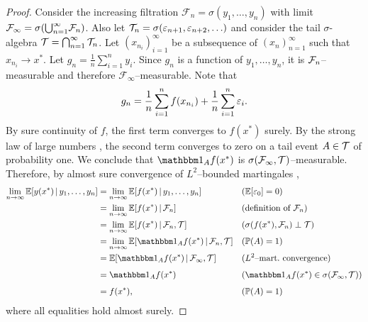 \documentclass[12pt, twoside]{report}
\begin{document}
\begin{proof}
    Consider the increasing filtration $\mathcal{F}_n = \sigma(y_1, \ldots, y_n)$ with limit $\mathcal{F}_\infty = \sigma(\smash{\bigcup_{n=1}^\infty} \mathcal{F}_n)$.
    Also let $\mathcal{T}_n = \sigma(\varepsilon_{n+1}, \varepsilon_{n+2}, \ldots)$ and consider the tail $\sigma$-algebra $\mathcal{T} = \bigcap_{n=1}^\infty \mathcal{T}_n$.
    Let $(x_{n_i})_{i=1}^\infty$ be a subsequence of $(x_n)_{n=1}^\infty$ such that $x_{n_i} \to x^*$.
    Let $g_n = \frac{1}{n} \sum_{i=1}^n y_i$.
    Since $g_n$ is a function of $y_1, \ldots, y_n$, it is $\mathcal{F}_n$--measurable and therefore $\mathcal{F}_\infty$--measurable.
    Note that
    \begin{equation}
        g_n = \frac{1}{n} \sum_{i=1}^n f(x_{n_i}) + \frac{1}{n} \sum_{i=1}^n \varepsilon_i.
    \end{equation}
    By sure continuity of $f$, the first term converges to $f(x^*)$ surely.
    By the strong law of large numbers \parencite[Example 5.6.1;][]{Durrett:2010:Probability_Theory_and_Examples}, %
    the second term converges to zero on a tail event $A \in \mathcal{T}$ of probability one.
    We conclude that $\ind_{A} f(x^*)$ is $\sigma(\mathcal{F}_\infty, \mathcal{T})$--measurable.
    Therefore, by almost sure convergence of $L^2$--bounded martingales \parencite[Theorem 5.4.5;][]{Durrett:2010:Probability_Theory_and_Examples}, 
    \begin{align}
        \lim_{n \to \infty} \E[y(x^*) \cond y_1, \ldots, y_n]
        &= \lim_{n \to \infty} \E[f(x^*) \cond y_1, \ldots, y_n] && \text{($\E[\e_0] = 0$)} \\
        &= \lim_{n \to \infty} \E[f(x^*) \cond \F_n]  && \text{(definition of $\F_n$)} \\
        &= \lim_{n \to \infty} \E[f(x^*) \cond \F_n, \Tc] && \text{($\sigma(f(x^*), \F_n) \perp \Tc$)} \\
        &= \lim_{n \to \infty} \E[\ind_A f(x^*) \cond \F_n, \Tc] && \text{($\P(A) = 1$)} \\
        &= \vphantom{\lim_n} \E[\ind_A f(x^*) \cond \F_\infty, \Tc] && \text{($L^2$--mart.\ convergence)}\\
        &= \vphantom{\lim_n} \ind_A f(x^*) && \text{($\ind_A f(x^*) \in \sigma(\F_\infty, \Tc)$)} \\
        &= f(x^*), && \text{($\P(A) = 1$)}
    \end{align}
    where all equalities hold almost surely.  
\end{proof}
\end{document}
